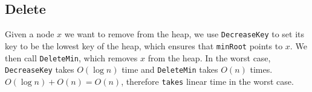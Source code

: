 \documentclass[a4paper,10pt]{article}
\begin{document}

\subsection*{Delete}
Given a node $x$ we want to remove from the heap, we use \texttt{DecreaseKey} to set its key to be the lowest key of the heap, which ensures that \texttt{minRoot} points to $x$. We then call \texttt{DeleteMin}, which removes $x$ from the heap.
In the worst case, \texttt{DecreaseKey} takes $O(\log n)$ time and \texttt{DeleteMin} takes $O(n)$ times.  $O(\log n) + O(n) = O(n)$, therefore \texttt{takes} linear time in the worst case.


\end{document}

